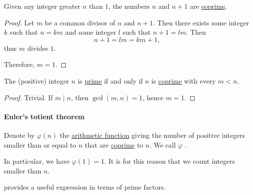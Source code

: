 \begin{proposition}\label{thm:n_plus_1_coprime}
  Given any integer greater \( n \) than \( 1 \), the numbers \( n \) and \( n + 1 \) are \hyperref[def:coprime_elements]{coprime}.
\end{proposition}
\begin{proof}
  Let \( m \) be a common divisor of \( n \) and \( n + 1 \). Then there exists some integer \( k \) such that \( n = km \) and some integer \( l \) such that \( n + 1 = lm \). Then
  \begin{equation*}
    n + 1 = lm = km + 1,
  \end{equation*}
  thus \( m \) divides \( 1 \).

  Therefore, \( m = 1 \).
\end{proof}

\begin{proposition}\label{thm:primality_via_coprimality}
  The (positive) integer \( n \) is \hyperref[def:prime_number]{prime} if and only if \( n \) is \hyperref[def:coprime_numbers]{coprime} with every \( m < n \).
\end{proposition}
\begin{proof}
  \SufficiencySubProof Trivial.
  \NecessitySubProof If \( m \mid n \), then \( \gcd(m, n) = 1 \), hence \( m = 1 \).
\end{proof}

\paragraph{Euler's totient theorem}

\begin{definition}\label{def:eulers_totient_function}
  Denote by \( \varphi(n) \) the \hyperref[def:arithmetic_function]{arithmetic function} giving the number of positive integers smaller than or equal to \( n \) that are \hyperref[def:coprime_elements]{coprime} to \( n \). We call \( \varphi \) .
\end{definition}
\begin{comments}
  \item In particular, we have \( \varphi(1) = 1 \). It is for this reason that we count integers smaller than  \( n \).
  \item {} provides a useful expression in terms of prime factors.
\end{comments}

